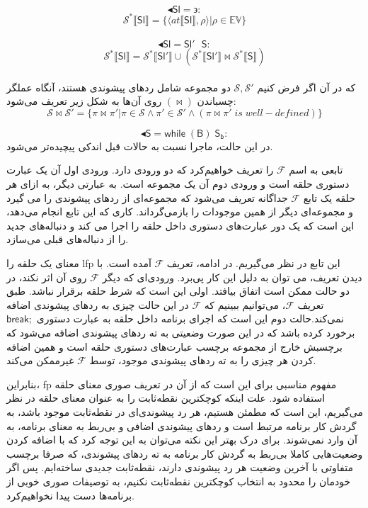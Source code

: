 \begin{defn}
	
	$$\blacktriangleleft\mathsf{Sl}=\backepsilon:$$
	$$\mathcal{S^*} \llbracket\mathsf{Sl}\rrbracket = \{ \langle at\llbracket\mathsf{Sl}\rrbracket , \rho \rangle | \rho \in \mathbb{EV}       \}        $$ \\
	
	$$\blacktriangleleft\mathsf{Sl} = \mathsf{Sl' \:\:\: S}:$$
	$$\mathcal{S^*} \llbracket\mathsf{Sl}\rrbracket = \mathcal{S^*} \llbracket\mathsf{Sl'}\rrbracket \cup( \mathcal{S^*} \llbracket\mathsf{Sl'}\rrbracket
	\Join \mathcal{S^*} \llbracket\mathsf{S}\rrbracket )      $$ \\
	که در آن اگر فرض کنیم 
	$\mathcal{S,S'}$
	دو مجموعه شامل ردهای پیشوندی هستند، آنگاه عملگر چسباندن 
	$(\Join)$
	روی آن‌ها به شکل زیر تعریف می‌شود:
	$$\mathcal{S}\Join \mathcal{S}' = \{\pi \Join \pi' | \pi \in \mathcal{S}\land\pi' \in \mathcal{S}'\land (\pi \Join \pi'\;is\; well-defined) \}$$
	
	
	$$\blacktriangleleft\mathsf{S} = \mathsf{while\;(B)\;S_b}:$$
	 در این حالت، ماجرا نسبت به حالات قبل اندکی پیچیده‌تر می‌شود.
	 
	تابعی به اسم $\mathcal{F} $ را تعریف خواهیم‌کرد که دو ورودی دارد. ورودی اول آن یک عبارت‌ دستوری حلقه است و ورودی دوم آن یک مجموعه است. به عبارتی دیگر، به ازای هر حلقه یک تابع $\mathcal{F} $  جداگانه تعریف می‌شود که مجموعه‌ای از ردهای پیشوندی را می گیرد و مجموعه‌ای دیگر از همین موجودات را بازمی‌گرداند. کاری که این تابع انجام می‌دهد، این است که یک دور عبارت‌های دستوری داخل حلقه را اجرا می کند و دنباله‌های جدید را از دنباله‌های قبلی می‌سازد. 
	
	معنای یک حلقه را \gls{lfp} این تابع در نظر می‌گیریم. در ادامه، تعریف $\mathcal{F} $ آمده است. با دیدن تعریف، می توان به دلیل این کار پی‌برد. ورودی‌ای که دیگر $\mathcal{F} $ روی آن اثر نکند، در دو حالت ممکن است اتفاق بیافتد. اولی این است که شرط حلقه برقرار نباشد. طبق تعریف $\mathcal{F} $،  می‌توانیم ببینیم که $\mathcal{F} $  در این حالت چیزی به ردهای پیشوندی اضافه نمی‌کند.حالت دوم این است که اجرای برنامه داخل حلقه به عبارت‌ دستوری $\mathsf{break;}$ برخورد کرده باشد که در این صورت وضعیتی به ته ردهای پیشوندی اضافه می‌شود که برچسبش خارج از مجموعه برچسب عبارت‌های دستوری حلقه است و همین اضافه کردن هر چیزی را به ته ردهای پیشوندی موجود، توسط $\mathcal{F} $  غیرممکن می‌کند. 
	
	بنابراین، \gls{fp} مفهوم مناسبی برای این است که از آن در تعریف صوری معنای حلقه استفاده شود. علت اینکه کوچکترین نقطه‌ثابت را به عنوان معنای حلقه در نظر می‌گیریم، این است که مطمئن هستیم، هر رد پیشوندی‌ای در نقطه‌ثابت موجود باشد، به گردش کار برنامه مرتبط است و ردهای پیشوندی اضافی و بی‌ربط به معنای برنامه، به آن وارد نمی‌شوند. برای درک بهتر این نکته می‌توان به این توجه کرد که با اضافه کردن وضعیت‌هایی کاملا بی‌ربط به گردش کار برنامه به ته رد‌های پیشوندی، که صرفا برچسب متفاوتی با آخرین وضعیت هر رد پیشوندی دارند، نقطه‌ثابت جدیدی ساخته‌ایم. پس اگر خودمان را محدود به انتخاب کوچکترین نقطه‌ثابت نکنیم، به توصیفات صوری خوبی از برنامه‌ها دست پیدا نخواهیم‌کرد. 
	

\end{defn}
